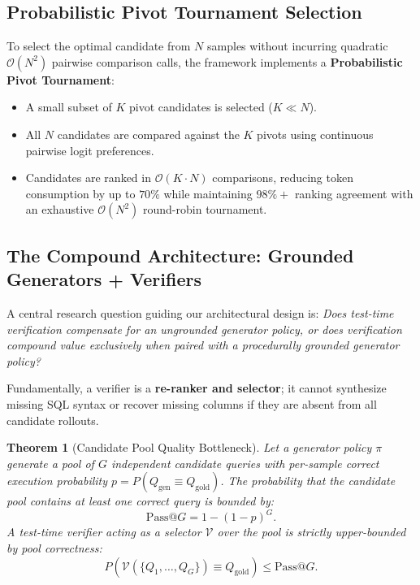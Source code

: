 \documentclass{article}
\theoremstyle{plain}
\newtheorem{theorem}{Theorem}[section]
\theoremstyle{definition}
\theoremstyle{remark}
\begin{document}
\subsection{Probabilistic Pivot Tournament Selection}
To select the optimal candidate from $N$ samples without incurring quadratic $\mathcal{O}(N^2)$ pairwise comparison calls, the framework implements a \textbf{Probabilistic Pivot Tournament}:
\begin{itemize}[leftmargin=*,itemsep=1pt]
    \item A small subset of $K$ pivot candidates is selected ($K \ll N$).
    \item All $N$ candidates are compared against the $K$ pivots using continuous pairwise logit preferences.
    \item Candidates are ranked in $\mathcal{O}(K \cdot N)$ comparisons, reducing token consumption by up to $70\%$ while maintaining $98\%+$ ranking agreement with an exhaustive $\mathcal{O}(N^2)$ round-robin tournament.
\end{itemize}

\subsection{The Compound Architecture: Grounded Generators + Verifiers}
A central research question guiding our architectural design is: \emph{Does test-time verification compensate for an ungrounded generator policy, or does verification compound value exclusively when paired with a procedurally grounded generator policy?}

Fundamentally, a verifier is a \textbf{re-ranker and selector}; it cannot synthesize missing SQL syntax or recover missing columns if they are absent from all candidate rollouts.

\begin{theorem}[Candidate Pool Quality Bottleneck]
Let a generator policy $\pi$ generate a pool of $G$ independent candidate queries with per-sample correct execution probability $p = P(Q_{\text{gen}} \equiv Q_{\text{gold}})$. The probability that the candidate pool contains at least one correct query is bounded by:
\begin{equation}
    \text{Pass@}G = 1 - (1 - p)^G.
\end{equation}
A test-time verifier acting as a selector $\mathcal{V}$ over the pool is strictly upper-bounded by pool correctness:
\begin{equation}
    P(\mathcal{V}(\{Q_1, \dots, Q_G\}) \equiv Q_{\text{gold}}) \le \text{Pass@}G.
\end{equation}
\end{theorem}
\end{document}
